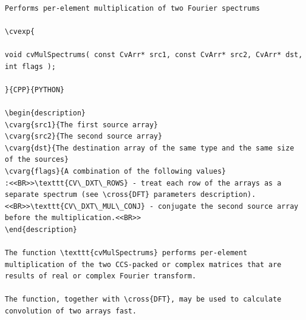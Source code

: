 \label{MulSpectrums}
\begin{verbatim}

Performs per-element multiplication of two Fourier spectrums

\cvexp{

void cvMulSpectrums( const CvArr* src1, const CvArr* src2, CvArr* dst, int flags );

}{CPP}{PYTHON}

\begin{description}
\cvarg{src1}{The first source array}
\cvarg{src2}{The second source array}
\cvarg{dst}{The destination array of the same type and the same size of the sources}
\cvarg{flags}{A combination of the following values}
:<<BR>>\texttt{CV\_DXT\_ROWS} - treat each row of the arrays as a separate spectrum (see \cross{DFT} parameters description).<<BR>>\texttt{CV\_DXT\_MUL\_CONJ} - conjugate the second source array before the multiplication.<<BR>>
\end{description}

The function \texttt{cvMulSpectrums} performs per-element multiplication of the two CCS-packed or complex matrices that are results of real or complex Fourier transform.

The function, together with \cross{DFT}, may be used to calculate convolution of two arrays fast.


\end{verbatim}
\label{DCT}
